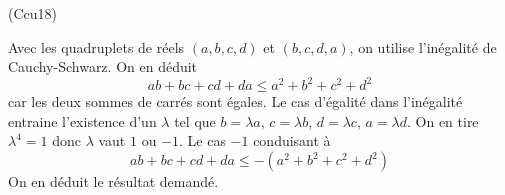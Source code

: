 \begin{tiny}(Ccu18)\end{tiny} Avec les quadruplets de réels $(a,b,c,d)$ et $(b,c,d,a)$, on utilise l'inégalité de Cauchy-Schwarz. On en déduit
\begin{displaymath}
 ab+bc+cd+da \leq a^2 + b^2 + c^2 +d^2
\end{displaymath}
car les deux sommes de carrés sont égales. Le cas d'égalité dans l'inégalité entraine l'existence d'un $\lambda$ tel que $b=\lambda a$, $c=\lambda b$, $d=\lambda c$, $a=\lambda d$. On en tire $\lambda^4 = 1$ donc $\lambda$ vaut $1$ ou $-1$.\newline
Le cas $-1$ conduisant à
\begin{displaymath}
 ab+bc+cd+da \leq - (a^2 + b^2 + c^2 +d^2)
\end{displaymath}
On en déduit le résultat demandé.